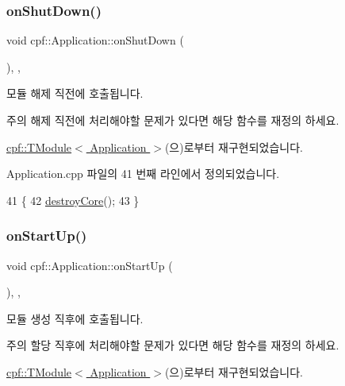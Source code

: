 \subsubsection{\texorpdfstring{on\+Shut\+Down()}{onShutDown()}}
{\footnotesize\ttfamily void cpf\+::\+Application\+::on\+Shut\+Down (\begin{DoxyParamCaption}{ }\end{DoxyParamCaption})\hspace{0.3cm}{\ttfamily [override]}, {\ttfamily [protected]}, {\ttfamily [virtual]}}

모듈 해제 직전에 호출됩니다. \begin{DoxyNote}{주의}
해제 직전에 처리해야할 문제가 있다면 해당 함수를 재정의 하세요. 
\end{DoxyNote}


\hyperlink{classcpf_1_1_t_module_a15c93b1aca54022e145961bea8e3ea7d}{cpf\+::\+T\+Module$<$ Application $>$}(으)로부터 재구현되었습니다.



Application.\+cpp 파일의 41 번째 라인에서 정의되었습니다.


\begin{DoxyCode}
41                                  \{
42         \hyperlink{classcpf_1_1_application_aa65f415f1e0866cab063d83ab428ebbc}{destroyCore}();
43     \}
\end{DoxyCode}
\mbox{\label{classcpf_1_1_application_ae8e759c8722c48c45dc3e02446062aec}} 
\subsubsection{\texorpdfstring{on\+Start\+Up()}{onStartUp()}}
{\footnotesize\ttfamily void cpf\+::\+Application\+::on\+Start\+Up (\begin{DoxyParamCaption}{ }\end{DoxyParamCaption})\hspace{0.3cm}{\ttfamily [override]}, {\ttfamily [protected]}, {\ttfamily [virtual]}}

모듈 생성 직후에 호출됩니다. \begin{DoxyNote}{주의}
할당 직후에 처리해야할 문제가 있다면 해당 함수를 재정의 하세요. 
\end{DoxyNote}


\hyperlink{classcpf_1_1_t_module_a4eb83b0848794e422d2d345439f51a04}{cpf\+::\+T\+Module$<$ Application $>$}(으)로부터 재구현되었습니다.




